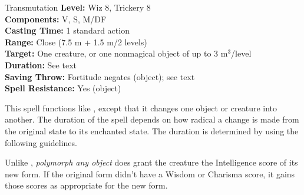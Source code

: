 {Transmutation}
{
	\textbf{Level:}
	Wiz 8, Trickery 8\\
	\textbf{Components:}
	V, S, M/DF\\
	\textbf{Casting Time:}
	1 standard action\\
	\textbf{Range:}
	Close (7.5 m + 1.5 m/2 levels)\\
	\textbf{Target:}
	One creature, or one nonmagical object of up to 3 m$^3$/level\\
	\textbf{Duration:}
	See text\\
	\textbf{Saving Throw:}
	Fortitude negates (object); see text\\
	\textbf{Spell Resistance:}
	Yes (object)\\
}
{
	This spell functions like , except that it changes one object or creature into another. The duration of the spell depends on how radical a change is made from the original state to its enchanted state. The duration is determined by using the following guidelines.



	Unlike , \emph{polymorph any object} does grant the creature the Intelligence score of its new form. If the original form didn't have a Wisdom or Charisma score, it gains those scores as appropriate for the new form.

}

